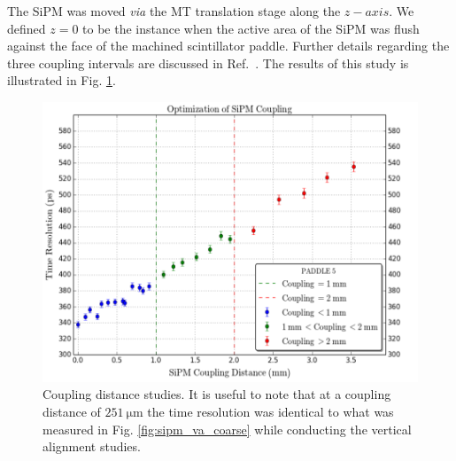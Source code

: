 The SiPM was moved \textit{via} the MT translation stage along the $z-axis$.  We defined $z = 0$ to be the instance when the active area of the SiPM was flush against the face of the machined scintillator paddle.  Further details regarding the three coupling intervals are discussed in Ref.~\cite{pooser16}.  The results of this study is illustrated in Fig. \ref{fig:sipm_coupling_coarse}.
	\begin{figure}[!htb]
		\centering
		\includegraphics[width=1.0\columnwidth]{misalignment/figs/sipm_coupling_coarse}
		\caption{Coupling distance studies.  It is useful to note that at a coupling distance of $\mathrm{251\ \mu m}$ the time resolution was identical to what was measured in Fig. \ref{fig:sipm_va_coarse} while conducting the vertical alignment studies.}
		\label{fig:sipm_coupling_coarse}
	\end{figure}

